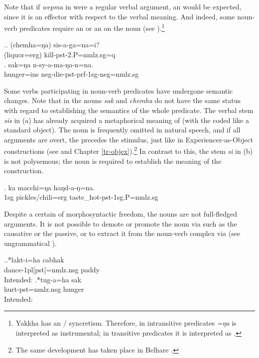 Note that if \emph{wepma} in  \Last[b] were a regular verbal argument, an   would be expected, since it is an effector with respect to the verbal meaning. And indeed, some noun-verb predicates require an  or an   on the noun (see \Next).\footnote{Yakkha has an / syncretism. Therefore, in intransitive predicates \emph{=ŋa} is interpreted as instrumental; in transitive predicates it is interpreted as .} 

\ex.\ag. (chemha=ŋa) sis-a-ga=na=i?\\
		(liquor{\sc =erg}) kill{\sc -pst-2.P=nmlz.sg=q}\\
	\bg. sak=ŋa n-sy-a-ma-ŋa-n=na.\\
			hunger{\sc =ins} {\sc neg-}die{\sc -pst-prf-1sg-neg=nmlz.sg}\\
	
	
Some verbs participating in noun-verb predicates have undergone semantic changes. Note that in \Last the nouns \emph{sak} and \emph{chemha} do not have the same status with regard to establishing the semantics of the whole predicate. The verbal stem \emph{sis}  in (a) has already acquired a metaphorical meaning  of  (with the  coded like a standard object). The noun is frequently omitted in natural speech, and if all arguments are overt, the  precedes the stimulus, just like in Experiencer-as-Object constructions (see \Next and Chapter \ref{tr-objex}).\footnote{The same development has taken place in Belhare \citep[151]{Bickel1997The-possessive}.} In contrast to this, the stem \emph{si} in (b) is not polysemous; the noun is required to establish the meaning of the construction. 
	
\exg. ka macchi=ŋa haŋd-a-ŋ=na.\\
	{\sc 1sg}	pickles/chili{\sc =erg} taste\_hot{\sc -pst-1sg.P=nmlz.sg}\\


Despite a certain  of morphosyntactic freedom, the nouns are not full-fledged arguments. It is not possible to demote or promote the noun via  such as the causative or the passive, or to extract it from the noun-verb complex via  (see ungrammatical \Next).
 
\ex.\ag.*lakt-i=ha cabhak\\
dance{\sc -1pl[pst]=nmlz.nsg} paddy\\
Intended: 
\bg.*tug-a=ha sak\\
hurt{\sc [3sg]-pst=nmlz.nsg} hunger\\
Intended: 


